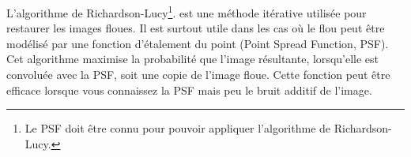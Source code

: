 L'algorithme de Richardson-Lucy\footnote{Le PSF doit être connu pour pouvoir appliquer l'algorithme de Richardson-Lucy.}. est une méthode itérative utilisée pour restaurer les images floues. 
Il est surtout utile dans les cas où le flou peut être modélisé par une fonction d'étalement du point (Point Spread Function, PSF). 
Cet algorithme maximise la probabilité que l'image résultante, lorsqu'elle est convoluée avec la PSF, soit une copie de l'image floue. 
Cette fonction peut être efficace lorsque vous connaissez la PSF mais peu le bruit additif de l'image.